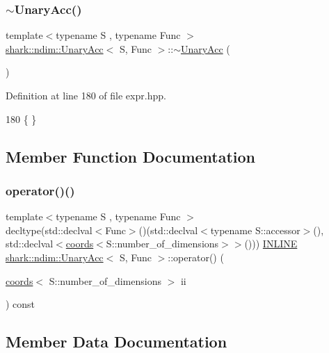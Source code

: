 \subsubsection{\texorpdfstring{$\sim$\+Unary\+Acc()}{~UnaryAcc()}}
{\footnotesize\ttfamily template$<$typename S , typename Func $>$ \\
\hyperlink{classshark_1_1ndim_1_1_unary_acc}{shark\+::ndim\+::\+Unary\+Acc}$<$ S, Func $>$\+::$\sim$\hyperlink{classshark_1_1ndim_1_1_unary_acc}{Unary\+Acc} (\begin{DoxyParamCaption}{ }\end{DoxyParamCaption})}



Definition at line 180 of file expr.\+hpp.


\begin{DoxyCode}
180 \{ \}
\end{DoxyCode}


\subsection{Member Function Documentation}
\hypertarget{classshark_1_1ndim_1_1_unary_acc_ab9a95cebe1e0acf123a375b32743453b}{}\label{classshark_1_1ndim_1_1_unary_acc_ab9a95cebe1e0acf123a375b32743453b} 
\subsubsection{\texorpdfstring{operator()()}{operator()()}}
{\footnotesize\ttfamily template$<$typename S , typename Func $>$ \\
decltype(std\+::declval$<$Func$>$()(std\+::declval$<$typename S\+::accessor$>$(), std\+::declval$<$\hyperlink{structshark_1_1ndim_1_1coords}{coords}$<$S\+::number\+\_\+of\+\_\+dimensions$>$$>$())) \hyperlink{common_8hpp_a2eb6f9e0395b47b8d5e3eeae4fe0c116}{I\+N\+L\+I\+NE} \hyperlink{classshark_1_1ndim_1_1_unary_acc}{shark\+::ndim\+::\+Unary\+Acc}$<$ S, Func $>$\+::operator() (\begin{DoxyParamCaption}\item[{\hyperlink{structshark_1_1ndim_1_1coords}{coords}$<$ S\+::number\+\_\+of\+\_\+dimensions $>$}]{ii }\end{DoxyParamCaption}) const}



\subsection{Member Data Documentation}
\hypertarget{classshark_1_1ndim_1_1_unary_acc_af254b8e0cfc968269a4e03d80f45a4eb}{}\label{classshark_1_1ndim_1_1_unary_acc_af254b8e0cfc968269a4e03d80f45a4eb} 
